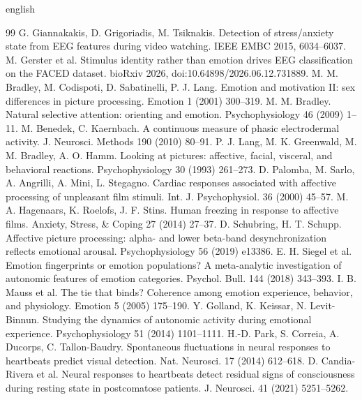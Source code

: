 \documentclass[10pt]{article}
\begin{document}
\begin{otherlanguage*}{english}
\begin{thebibliography}{99}\footnotesize\setlength{\itemsep}{1.2pt}
 G. Giannakakis, D. Grigoriadis, M. Tsiknakis. Detection of stress/anxiety state from EEG features during video watching. IEEE EMBC 2015, 6034--6037.
 M. Gerster et al. Stimulus identity rather than emotion drives EEG classification on the FACED dataset. bioRxiv 2026, doi:10.64898/2026.06.12.731889.
 M. M. Bradley, M. Codispoti, D. Sabatinelli, P. J. Lang. Emotion and motivation II: sex differences in picture processing. Emotion 1 (2001) 300--319.
 M. M. Bradley. Natural selective attention: orienting and emotion. Psychophysiology 46 (2009) 1--11.
 M. Benedek, C. Kaernbach. A continuous measure of phasic electrodermal activity. J. Neurosci. Methods 190 (2010) 80--91.
 P. J. Lang, M. K. Greenwald, M. M. Bradley, A. O. Hamm. Looking at pictures: affective, facial, visceral, and behavioral reactions. Psychophysiology 30 (1993) 261--273.
 D. Palomba, M. Sarlo, A. Angrilli, A. Mini, L. Stegagno. Cardiac responses associated with affective processing of unpleasant film stimuli. Int. J. Psychophysiol. 36 (2000) 45--57.
 M. A. Hagenaars, K. Roelofs, J. F. Stins. Human freezing in response to affective films. Anxiety, Stress, \& Coping 27 (2014) 27--37.
 D. Schubring, H. T. Schupp. Affective picture processing: alpha- and lower beta-band desynchronization reflects emotional arousal. Psychophysiology 56 (2019) e13386.
 E. H. Siegel et al. Emotion fingerprints or emotion populations? A meta-analytic investigation of autonomic features of emotion categories. Psychol. Bull. 144 (2018) 343--393.
 I. B. Mauss et al. The tie that binds? Coherence among emotion experience, behavior, and physiology. Emotion 5 (2005) 175--190.
 Y. Golland, K. Keissar, N. Levit-Binnun. Studying the dynamics of autonomic activity during emotional experience. Psychophysiology 51 (2014) 1101--1111.
 H.-D. Park, S. Correia, A. Ducorps, C. Tallon-Baudry. Spontaneous fluctuations in neural responses to heartbeats predict visual detection. Nat. Neurosci. 17 (2014) 612--618.
 D. Candia-Rivera et al. Neural responses to heartbeats detect residual signs of consciousness during resting state in postcomatose patients. J. Neurosci. 41 (2021) 5251--5262.

\end{thebibliography}
\end{otherlanguage*}
\end{document}
